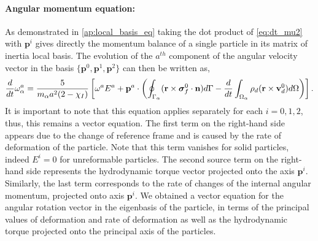 \paragraph*{Angular momentum equation:}
As demonstrated in \ref{ap:local_basis_eq} taking the dot product of \ref{eq:dt_mu2} with $\textbf{p}^i$ gives directly the momentum balance of a single particle in its matrix of inertia local basis. 
The evolution of the $a^{th}$ component of the angular velocity vector in the basis $\{\textbf{p}^0, \textbf{p}^1, \textbf{p}^2\}$ can then be written as, 
\begin{equation}
    \ddt\omega^a_\alpha
    = 
    \frac{5}{m_\alpha a^2 (2 - \chi_I)}
    \left[
    \omega^a E^a 
    +
    \textbf{p}^a \cdot \left(
        \intS{(\textbf{r}\times\bm\sigma_f^0\cdot \textbf{n})} 
        - \ddt\intO{\rho_d(\textbf{r}\times \textbf{v}_d^0)}
    \right)
    \right].  
    \label{eq:dt_omega_a}  
\end{equation}
It is important to note that this equation applies separately for each $i = 0,1,2$, thus, this remains a vector equation. 
The first term on the right-hand side appears due to the change of reference frame and is caused by the rate of deformation of the particle.
Note that this term vanishes for solid particles, indeed $E^i = 0$ for unreformable particles. 
The second source term on the right-hand side represents the hydrodynamic torque vector projected onto the axis $\textbf{p}^i$. 
Similarly, the last term corresponds to the rate of changes of the internal angular momentum, projected onto axis $\textbf{p}^i$. 
We obtained a vector equation for the angular rotation vector in the eigenbasis of the particle, in terms of the principal values of deformation and rate of deformation as well as the hydrodynamic torque projected onto the principal axis of the particles.  




